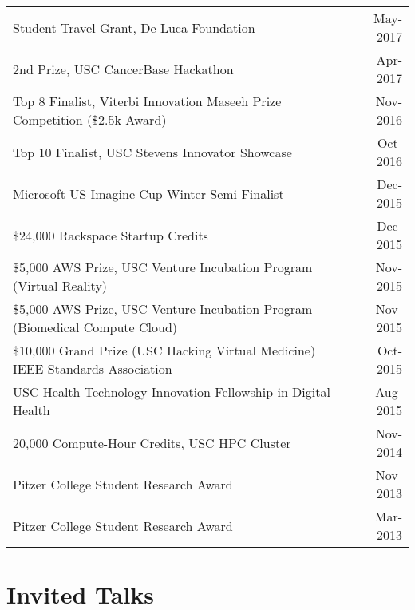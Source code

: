 \documentclass[10pt,a4paper]{article}
\begin{document}
  \vspace*{1mm}\noindent\begin{tabularx}{17cm}{X r}
    Student Travel Grant, De Luca Foundation & May-2017\\ %
    2nd Prize, USC CancerBase Hackathon & Apr-2017 \\ %
    Top 8 Finalist, Viterbi Innovation Maseeh Prize Competition (\$2.5k Award) & Nov-2016 \\ %
    Top 10 Finalist, USC Stevens Innovator Showcase & Oct-2016 \\ %
    Microsoft US Imagine Cup Winter Semi-Finalist & Dec-2015 \\
    \$24,000 Rackspace Startup Credits & Dec-2015\\
    \$5,000 AWS Prize, USC Venture Incubation Program (Virtual Reality) & Nov-2015\\
    \$5,000 AWS Prize, USC Venture Incubation Program (Biomedical Compute Cloud) & Nov-2015\\
    \$10,000 Grand Prize (USC Hacking Virtual Medicine) IEEE Standards Association  & Oct-2015\\ %
    USC Health Technology Innovation Fellowship in Digital Health& Aug-2015\\ 

    20,000 Compute-Hour Credits, USC HPC Cluster & Nov-2014 \\
    Pitzer College Student Research Award & Nov-2013 \\
    Pitzer College Student Research Award & Mar-2013 \\
  \end{tabularx}

  \vspace*{2mm}\section*{Invited Talks}
\end{document}
